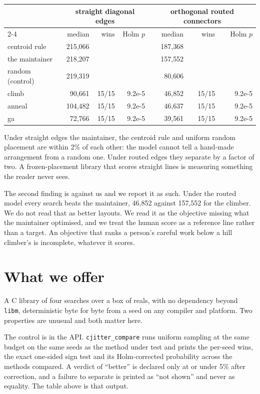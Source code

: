 \documentclass[11pt]{article}
\begin{document}
\begin{center}\small
\begin{tabular}{lrrr@{\hspace{18pt}}rrr}
\toprule
& \multicolumn{3}{c}{straight diagonal edges} & \multicolumn{3}{c}{orthogonal routed connectors} \\
\cmidrule(r){2-4}\cmidrule{5-7}
 & median & wins & Holm $p$ & median & wins & Holm $p$ \\
\midrule
centroid rule    & 215{,}066 & & & 187{,}368 & & \\
the maintainer   & 218{,}207 & & & 157{,}552 & & \\
random (control) & 219{,}319 & & & 80{,}606 & & \\
climb            & 90{,}661 & 15/15 & 9.2e-5 & 46{,}852 & 15/15 & 9.2e-5 \\
anneal           & 104{,}482 & 15/15 & 9.2e-5 & 46{,}637 & 15/15 & 9.2e-5 \\
ga               & 72{,}766 & 15/15 & 9.2e-5 & 39{,}561 & 15/15 & 9.2e-5 \\
\bottomrule
\end{tabular}
\end{center}

Under straight edges the maintainer, the centroid rule and uniform random placement are
within 2\% of each other: the model cannot tell a hand-made arrangement from a random one.
Under routed edges they separate by a factor of two. A frozen-placement library that scores
straight lines is measuring something the reader never sees.

The second finding is against us and we report it as such. Under the routed model every
search beats the maintainer, 46{,}852 against 157{,}552 for the climber. We do not read that
as better layouts. We read it as the objective missing what the maintainer optimised, and we
treat the human score as a reference line rather than a target. An objective that ranks a
person's careful work below a hill climber's is incomplete, whatever it scores.

\section{What we offer}

A C library of four searches over a box of reals, with no dependency beyond \texttt{libm},
deterministic byte for byte from a seed on any compiler and platform. Two properties are
unusual and both matter here.

The control is in the API. \texttt{cjitter\_compare} runs uniform sampling at the same
budget on the same seeds as the method under test and prints the per-seed wins, the exact
one-sided sign test and its Holm-corrected probability across the methods compared. A
verdict of ``better'' is declared only at or under 5\% after correction, and a failure to
separate is printed as ``not shown'' and never as equality. The table above is that output.
\end{document}
